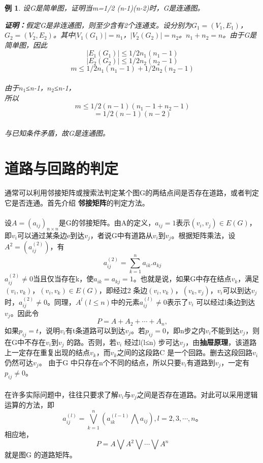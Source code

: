 \documentclass[11pt,a4paper,openany]{book}
\newtheorem{sample}{\textbf{例}}[section]
\begin{document}
\begin{sample}
设G是简单图，证明当m=1/2 (n-1)(n-2)时，G是连通图。
\begin{adjustwidth}{0.62cm}{0.62cm}
\textbf{证明：}假定G是非连通图，则至少含有2个连通支。设分别为$G_1=(V_1,E_1)$，$G_2=(V_2,E_2)$。其中$|V_1 (G_1 )|=n_1$，$|V_2 (G_2 )|=n_2$。$n_1+n_2=n$。由于G是简单图，因此$$|E_1 (G_1 )|\leq1/2 n_1(n_1-1)$$$$|E_2 (G_2 )|\leq1/2 n_2 (n_2-1)$$$$m\leq1/2 n_1(n_1-1)+1/2 n_2(n_2-1)$$\\
由于$n_1$≤n-1，$n_2$≤n-1，\\
所以$$m\leq1/2 (n-1)(n_1-1+n_2-1)$$$$=1/2 (n-1)(n-2)$$\\
与已知条件矛盾，故G是连通图。
%
\end{adjustwidth}
\end{sample}

\section{道路与回路的判定}
\paragraph{}通常可以利用邻接矩阵或搜索法判定某个图G的两结点间是否存在道路，或者判定它是否连通。首先介绍\textbf{ 邻接矩阵}的判定方法。
\paragraph{}设$A=(a_{ij})_{n\times n}$是G的邻接矩阵。由A的定义，$a_{ij}=1$表示$(v_i,v_j )\in E(G)$，即$v_i$可以通过某条边e到达$v_j$，者说G中有道路从$v_i$到$v_j$。根据矩阵乘法，设$A^2=(a_{ij}^{(2)})$，有
\begin{displaymath}
a_{ij}^{(2)}=\sum_{k=1}^{n}a_{ik}.a_{kj}
\end{displaymath}
$a_{ij}^{(2)}\neq 0$当且仅当存在k，使$a_{ik}=a_{kj}=1$。也就是说，如果G中存在结点$v_k$，满足$(v_i,v_k )$，$(v_i,v_k )\in E(G)$，即经过2 条边$(v_i,v_k)$，$(v_k,v_j)$，$v_i$可以到达$v_j$时，$a_{ij}^{(2)}\neq 0$。同理，$A^l(l≤n)$中的元素$a_{ij}^{(l)}\neq0$表示了$v_i$ 可以经过l条边到达$v_j$。因此令$$P=A+A_2+\cdots+A_n,$$如果$p_{ij}=t$，说明$v_i$有t条道路可以到达$v_j$。若$p_{ij}=0$，即n步之内$v_i$不能到达$v_j$，则在G中不存在$v_i$到$v_j$ 的路。否则，若$v_i$ 经过l(l≤n) 步可达$v_j$，由\textbf{抽屉原理}，该道路上一定存在重复出现的结点$v_k$，而$v_k$之间的这段路C 是一个回路。删去这段回路$v_i$ 仍然可达$v_j$。 由于G 中只存在n个不同的结点，所以只要$v_i$有道路到$v_j$，一定有$p_{ij}≠0$。
\paragraph{}在许多实际问题中，往往只要求了解$v_i$与$v_j$之间是否存在道路。对此可以采用逻辑运算的方法，即$$a_{ij}^{(l)}=\bigvee_{k=1}^{n}(a_{ik}^{(l-1)}\bigwedge a_{ij}),l=2,3,\cdots,n。$$相应地，$$P=A\bigvee A^2 \bigvee \cdots \bigvee A^n$$就是图G 的道路矩阵。
\end{document}
